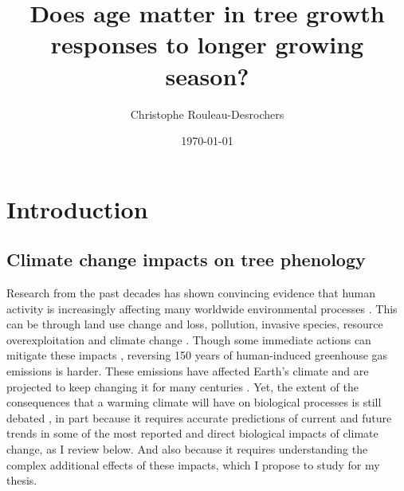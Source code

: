 \documentclass{article}
\title{Does age matter in tree growth responses to longer growing season?} %
\date{\today}
\author{Christophe Rouleau-Desrochers}
\begin{document}

\maketitle

\section*{Introduction}
\subsection*{Climate change impacts on tree phenology}
Research from the past decades has shown convincing evidence that human activity is increasingly affecting many worldwide environmental processes \citep{ceballos_biological_2017,intergovernmental_panel_on_climate_change_climate_2023,laurance_have_2007,parmesan_globally_2003}. 
This can be through land use change and loss, pollution, invasive species, resource overexploitation and climate change \citep{driscoll_biodiversity-crisis_2018,parmesan_poleward_1999,wu_key_2013}. Though some immediate actions can mitigate these impacts \citep[e.g.][]{campbell_producing_2014}, reversing 150 years of human-induced greenhouse gas emissions is harder. These emissions have affected Earth's climate and are projected to keep changing it for many centuries \citep{intergovernmental_panel_on_climate_change_climate_2023}. Yet, the extent of the consequences that a warming climate will have on biological processes is still debated \citep{huey_predicting_2012}, in part because it requires accurate predictions of current and future trends in some of the most reported and direct biological impacts of climate change, as I review below. And also because it requires understanding the complex additional effects of these impacts, which I propose to study for my thesis. \\

\end{document}
